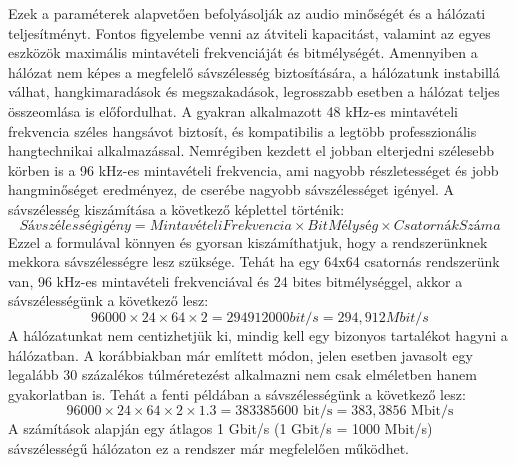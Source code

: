 Ezek a paraméterek alapvetően befolyásolják az audio minőségét és a hálózati teljesítményt.
Fontos figyelembe venni az átviteli kapacitást, valamint az egyes eszközök maximális mintavételi frekvenciáját és bitmélységét.
Amennyiben a hálózat nem képes a megfelelő sávszélesség biztosítására, a hálózatunk instabillá válhat, 
hangkimaradások és megszakadások, legrosszabb esetben a hálózat teljes összeomlása is előfordulhat.
A gyakran alkalmazott 48 kHz-es mintavételi frekvencia széles hangsávot biztosít, és kompatibilis a legtöbb
professzionális hangtechnikai alkalmazással. 
Nemrégiben kezdett el jobban elterjedni szélesebb körben is a 96 kHz-es mintavételi frekvencia, ami
nagyobb részletességet és jobb hangminőséget eredményez, de cserébe nagyobb sávszélességet igényel.
A sávszélesség kiszámítása a következő képlettel történik:
\begin{equation}
	\label{eq:sávszélesség}
	Sávszélesség igény = MintavételiFrekvencia \times BitMélység \times CsatornákSzáma
\end{equation}
Ezzel a formulával könnyen és gyorsan kiszámíthatjuk, hogy a rendszerünknek mekkora sávszélességre lesz szüksége.
Tehát ha egy 64x64 csatornás rendszerünk van, 96 kHz-es mintavételi frekvenciával és 24 bites bitmélységgel,
akkor a sávszélességünk a következő lesz:
\begin{equation}
	\label{eq:sávszélesség}
	96000 \times 24 \times 64 \times 2 = 294912000 bit/s = 294,912 Mbit/s
\end{equation}
A hálózatunkat nem centizhetjük ki, mindig kell egy bizonyos tartalékot hagyni a hálózatban. A korábbiakban már említett módon,
jelen esetben javasolt egy legalább 30 százalékos túlméretezést alkalmazni nem csak elméletben hanem gyakorlatban is. 
Tehát a fenti példában a sávszélességünk a következő lesz:
\begin{equation}
    \label{eq:teljes-sávszélesség}
    96000 \times 24 \times 64 \times 2 \times 1.3 = 383385600 \text{ bit/s} = 383,3856 \text{ Mbit/s}
\end{equation}
A számítások alapján egy átlagos 1 Gbit/s (1 Gbit/s = 1000 Mbit/s) sávszélességű hálózaton ez a rendszer már megfelelően működhet.
